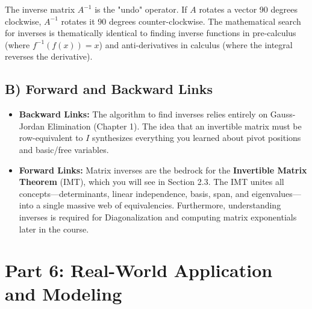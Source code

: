 \documentclass[11pt]{article}
\begin{document}
The inverse matrix $A^{-1}$ is the "undo" operator. If $A$ rotates a vector 90 degrees clockwise, $A^{-1}$ rotates it 90 degrees counter-clockwise. The mathematical search for inverses is thematically identical to finding inverse functions in pre-calculus (where $f^{-1}(f(x)) = x$) and anti-derivatives in calculus (where the integral reverses the derivative). 

\subsection{B) Forward and Backward Links}
\begin{itemize}
    \item \textbf{Backward Links:} The algorithm to find inverses relies entirely on Gauss-Jordan Elimination (Chapter 1). The idea that an invertible matrix must be row-equivalent to $I$ synthesizes everything you learned about pivot positions and basic/free variables.
    \item \textbf{Forward Links:} Matrix inverses are the bedrock for the \textbf{Invertible Matrix Theorem} (IMT), which you will see in Section 2.3. The IMT unites all concepts—determinants, linear independence, basis, span, and eigenvalues—into a single massive web of equivalencies. Furthermore, understanding inverses is required for Diagonalization and computing matrix exponentials later in the course.
\end{itemize}

\newpage
\section{Part 6: Real-World Application and Modeling}
\end{document}

